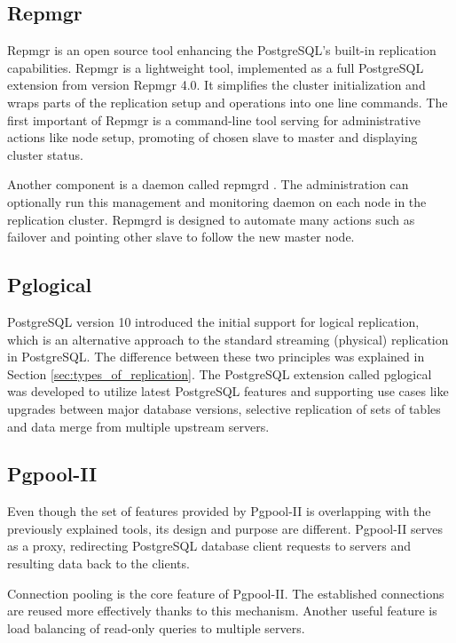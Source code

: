 \documentclass[
  digital, %
  twoside, %
  table,   %
  lof,     %
  lot,     %
]{fithesis3}
\begin{document}
\subsection{Repmgr} \label{sec:repmgr}
Repmgr \cite{repmgr} is an open source tool enhancing the PostgreSQL's built-in replication capabilities. Repmgr is a lightweight tool, implemented as a full PostgreSQL extension from version Repmgr 4.0. It simplifies the cluster initialization and wraps parts of the replication setup and operations into one line commands.
The first important  of Repmgr is a command-line tool serving for administrative actions like node setup, promoting of chosen slave to master and displaying cluster status.

Another component is a daemon called repmgrd \cite{repmgrd}. The administration can optionally run this management and monitoring daemon on each node in the replication cluster. Repmgrd is designed to automate many actions such as failover and pointing other slave to follow the new master node.

\subsection{Pglogical}
PostgreSQL version 10 introduced the initial support for logical replication, which is an alternative approach to the standard streaming (physical) replication in PostgreSQL. The difference between these two principles was explained in Section \ref{sec:types_of_replication}. The PostgreSQL extension called pglogical \cite{pglogical} was developed to utilize latest PostgreSQL features and supporting use cases like upgrades between major database versions, selective replication of sets of tables and data merge from multiple upstream servers.

\subsection{Pgpool-II} \label{sec:pgpool}
Even though the set of features provided by Pgpool-II \cite{pgpool} is overlapping with the previously explained tools, its design and purpose are different. Pgpool-II serves as a proxy, redirecting PostgreSQL database client requests to servers and resulting data back to the clients.

Connection pooling is the core feature of Pgpool-II. The established connections are reused more effectively thanks to this mechanism. Another useful feature is load balancing of read-only queries to multiple servers.
\end{document}

